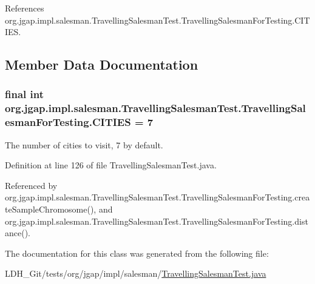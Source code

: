 References org.\-jgap.\-impl.\-salesman.\-Travelling\-Salesman\-Test.\-Travelling\-Salesman\-For\-Testing.\-C\-I\-T\-I\-E\-S.



\subsection{Member Data Documentation}
\hypertarget{classorg_1_1jgap_1_1impl_1_1salesman_1_1_travelling_salesman_test_1_1_travelling_salesman_for_testing_af3a7d892c006e39524622ed2ee779c16}{
\subsubsection[{C\-I\-T\-I\-E\-S}]{\setlength{\rightskip}{0pt plus 5cm}final int org.\-jgap.\-impl.\-salesman.\-Travelling\-Salesman\-Test.\-Travelling\-Salesman\-For\-Testing.\-C\-I\-T\-I\-E\-S = 7\hspace{0.3cm}{\ttfamily [static]}}}\label{classorg_1_1jgap_1_1impl_1_1salesman_1_1_travelling_salesman_test_1_1_travelling_salesman_for_testing_af3a7d892c006e39524622ed2ee779c16}
The number of cities to visit, 7 by default. 

Definition at line 126 of file Travelling\-Salesman\-Test.\-java.



Referenced by org.\-jgap.\-impl.\-salesman.\-Travelling\-Salesman\-Test.\-Travelling\-Salesman\-For\-Testing.\-create\-Sample\-Chromosome(), and org.\-jgap.\-impl.\-salesman.\-Travelling\-Salesman\-Test.\-Travelling\-Salesman\-For\-Testing.\-distance().



The documentation for this class was generated from the following file\-:\begin{DoxyCompactItemize}
\item 
L\-D\-H\-\_\-\-Git/tests/org/jgap/impl/salesman/\hyperlink{_travelling_salesman_test_8java}{Travelling\-Salesman\-Test.\-java}\end{DoxyCompactItemize}

